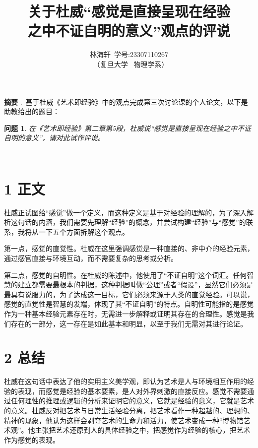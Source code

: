 \documentclass[twocolumn]{ctexart}
\title{关于杜威“感觉是直接呈现在经验\\之中不证自明的意义”观点的评说}
\author{ 林海轩\ 学号:23307110267 \\\ （复旦大学 \ 物理学系）}
\date{\vspace{-2em}}
\begin{document}
	
	\maketitle
	
	\begin{strip}
		
		\noindent  \textbf{摘要} .\ 基于杜威《艺术即经验》中的观点完成第三次讨论课的个人论文，以下是助教给出的题目：
		\newtheorem*{lemma}{问题}
		\begin{lemma}
			在《艺术即经验》第二章第5段，杜威说“感觉是直接呈现在经验之中不证自明的意义”，请对此试作评说。
		\end{lemma}
		
		\leavevmode\\
	\end{strip}
	
	
	\section*{1  正文}
	
		杜威正试图给“感觉”做一个定义，而这种定义是基于对经验的理解的，为了深入解析这句话的内涵，我们需要先理解“经验”的概念，并尝试构建“经验”与“感觉”的联系，我将从一下五个方面拆解这个观点。
	
		第一点，感觉的直觉性。杜威在这里强调感觉是一种直接的、非中介的经验元素，通过感官直接与环境互动，而不需要复杂的思考或分析。
		
		第二点，感觉的自明性。在杜威的陈述中，他使用了“不证自明”这个词汇。任何智慧的建立都需要最根本的判据，这种判据叫做“公理”或者“假设”，显然它们必须是最具有说服力的，为了达成这一目标，它们必须来源于人类的直觉经验。可以说，感觉的直觉性是智慧的发端，体现了其“不证自明”的特点。自明性可能指的是感觉作为一种基本经验元素存在时，无需进一步解释或证明其存在的合理性。感觉是我们存在的一部分，这一存在是如此基本和明显，以至于我们无需对其进行论证。
	
	
	
	\section*{2 总结}
		杜威在这句话中表达了他的实用主义美学观，即认为艺术是人与环境相互作用的经验的表现，而感觉是经验的基本要素，是人对外界刺激的直接反应。感觉不需要通过任何理性的推理或逻辑的分析来证明它的意义，它就是经验的意义，它就是艺术的意义。杜威反对把艺术与日常生活经验分离，把艺术看作一种超越的、理想的、精神的现象，他认为这样会剥夺艺术的生命力和活力，使艺术变成一种“博物馆艺术观”。他主张把艺术还原到人的具体经验之中，把感觉作为经验的核心，把艺术作为感觉的表现。
	
\end{document}

